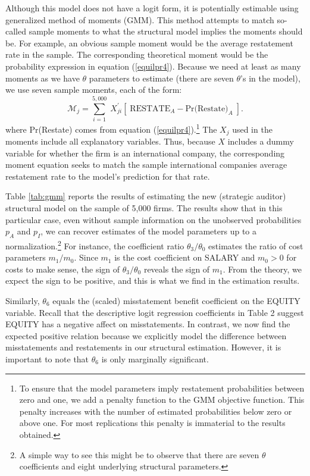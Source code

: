 Although this model does not have a logit form, it is potentially estimable using 
generalized method of moments (GMM).
This method attempts to match so-called sample moments to what the structural model implies the moments should be. 
For example, an obvious sample moment would be the average restatement rate in the sample.
The corresponding theoretical moment would be the probability expression in equation (\ref{equilpr4}).
Because we need at least as many moments as we have $\theta$ parameters to estimate (there are seven $\theta$'s in the model), we use seven sample moments, each of the form:
$$ \mathcal{M}_j = \sum_{i=1}^{5,000} \; X_{ji}^\prime\left[\; \mbox{RESTATE}_A - \mbox{Pr(Restate)}_A \; \right]. $$
where Pr(Restate) comes from equation (\ref{equilpr4}).\footnote{
To ensure that the model parameters imply restatement probabilities between zero and one, we add a penalty function to the GMM objective function.
This penalty increases with the number of estimated probabilities below zero or above one.
For most replications this penalty is immaterial to the results obtained.} 
The $X_j$ used in the moments include all explanatory variables. 
Thus, because $X$ includes  a dummy variable for whether the firm is an international company, the corresponding moment equation seeks to match the sample international companies average restatement rate to the model's prediction for that rate.

Table \ref{tab:gmm} reports the results of estimating the new (strategic auditor) structural model on the sample of 5,000 firms. 
The results show that in this particular case, even without sample information on the unobserved probabilities $p_A$ and $p_I$, we can recover estimates of the model parameters up to a normalization.\footnote{
A simple way to see this might be to observe that there are seven $\theta$ coefficients and eight underlying structural parameters.} 
For instance, the coefficient ratio $\theta_3/\theta_0$ estimates the ratio of cost parameters $m_1/m_0$.
Since $m_1$ is the cost coefficient on SALARY and $m_0>0$ for costs to make sense, the sign of $\theta_3/\theta_0$ reveals the sign of $m_1$.
From the theory, we expect the sign to be positive, and this is what we find in the estimation results. 

Similarly, $\theta_6$ equals the (scaled) misstatement benefit coefficient on the EQUITY variable.
Recall that the descriptive logit regression coefficients in Table 2  suggest EQUITY has a negative affect on misstatements.  In contrast, we now find the expected positive relation because we explicitly model the difference between misstatements and restatements in our structural estimation. However, it is important to note that $\theta_6$ is only marginally significant.

